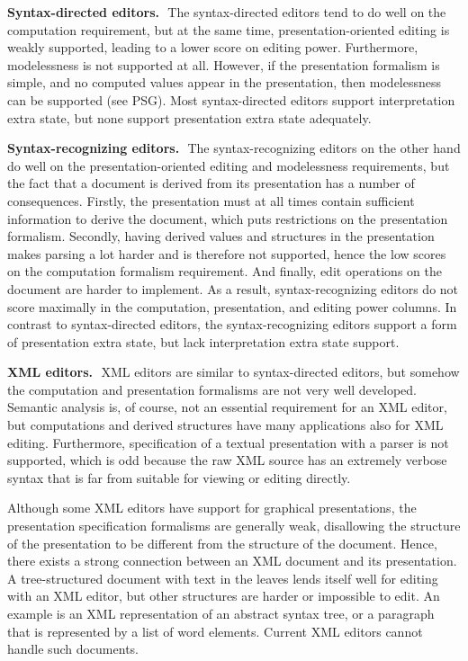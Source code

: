 \documentclass{speauth}
\begin{document}
{\bf Syntax-directed editors.}~\,The syntax-directed editors tend to do well on the computation requirement, but at the same time, presentation-oriented editing is weakly supported, leading to a lower score on editing power. Furthermore, modelessness is not supported at all. However, if the presentation formalism is simple, and no computed values appear in the presentation, then modelessness can be supported (see PSG). Most syntax-directed editors support interpretation extra state, but none support presentation extra state adequately.

{\bf Syntax-recognizing editors.}~\,The syntax-recognizing editors on the other hand do well on the presentation-oriented editing and modelessness requirements, but the fact that a document is derived from its presentation has a number of consequences. Firstly, the presentation must at all times contain sufficient information to derive the document, which puts restrictions on the presentation formalism. Secondly, having derived values and structures in the presentation makes parsing a lot harder and is therefore not supported, hence the low scores on the computation formalism requirement. And finally, edit operations on the document are harder to implement. As a result, syntax-recognizing editors do not score maximally in the computation, presentation, and editing power columns. In contrast to syntax-directed editors, the syntax-recognizing editors support a form of presentation extra state, but lack interpretation extra state support.

{\bf XML editors.}~\,XML editors are similar to syntax-directed editors, but somehow the computation and presentation formalisms are not very well developed. Semantic analysis is, of course, not an essential requirement for an XML editor, but computations and derived structures have many applications also for XML editing. Furthermore, specification of a textual presentation with a parser is not supported, which is odd because the raw XML source has an extremely verbose syntax that is far from suitable for viewing or editing directly.

Although some XML editors have support for graphical presentations, the presentation specification formalisms are generally weak, disallowing the structure of the presentation to be different from the structure of the document. Hence, there exists a strong connection between an XML document and its presentation. A tree-structured document with text in the leaves lends itself well for editing with an XML editor, but other structures are harder or impossible to edit. An example is an XML representation of an abstract syntax tree, or a paragraph that is represented by a list of word elements. Current XML editors cannot handle such documents.
\end{document}
